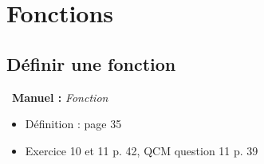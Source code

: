 \documentclass[a4paper, french, 12pt]{article}  %
\newenvironment{manuel}[1]
{\par \medskip  \noindent  
\begin{bclogo}[arrondi =0.1,   noborder = true, logo=\bcoeil, marge=4]{~\textbf{Manuel :}  {\itshape #1} }  \itshape \par}
{
\end{bclogo}
 \par \bigskip }
\begin{document}
\section{Fonctions}

\subsection{Définir une fonction}


\begin{manuel}{Fonction}
\begin{itemize}[label=]
 \item Définition  : page 35
 \item Exercice 10 et 11 p. 42, QCM question 11  p. 39
\end{itemize}
\end{manuel}
 
\end{document}

